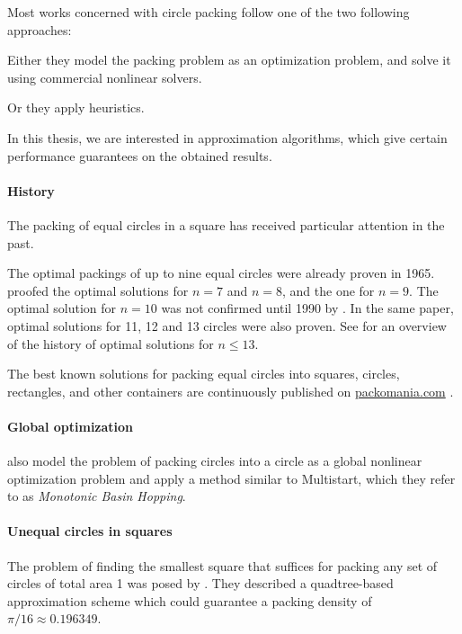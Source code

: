Most works concerned with circle packing follow one of the two following approaches:

Either they model the packing problem as an optimization problem, and solve it using commercial nonlinear solvers.

Or they apply heuristics.

In this thesis, we are interested in approximation algorithms, which give certain performance guarantees on the obtained results.

\paragraph{History}

The packing of equal circles in a square has received particular attention in the past.

The optimal packings of up to nine equal circles were already proven in 1965.
\textcite{schaer1965densest} proofed the optimal solutions for $n = 7$ and $n = 8$, and \textcite{SM1965geometric} the one for $n = 9$.
The optimal solution for $n = 10$ was not confirmed until 1990 by \textcite{DPW1990optimal}. In the same paper, optimal solutions for 11, 12 and 13 circles were also proven.
See \textcite{WMP1994history} for an overview of the history of optimal solutions for $n \le 13$.

The best known solutions for packing equal circles into squares, circles, rectangles, and other containers are continuously published on \url{packomania.com} \cite{specht2015packomania}.

\paragraph{Global optimization}

\textcite{GJLS2009solving} also model the problem of packing circles into a circle as a global nonlinear optimization problem and apply a method similar to Multistart, which they refer to as \emph{Monotonic Basin Hopping}.

\paragraph{Unequal circles in squares}

The problem of finding the smallest square that suffices for packing any set of circles of total area 1 was posed by \textcite{DFL2010circle}. They described a quadtree-based approximation scheme which could guarantee a packing density of $\pi/16 \approx 0.196349$.


